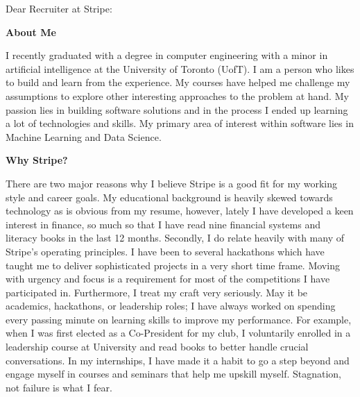\documentclass[a4paper,english]{friggeri-letter}
\begin{document}

\address{
   85 Wood St \\
   Toronto, ON, Canada
}





\opening{Dear Recruiter at Stripe:}

\textbf{About Me}

I recently graduated with a degree in computer engineering with a minor in artificial intelligence at the University of Toronto (UofT). I am a person who likes to build and learn from the experience. My courses have helped me challenge my assumptions to explore other interesting approaches to the problem at hand. My passion lies in building software solutions and in the process I ended up learning a lot of technologies and skills. My primary area of interest within software lies in Machine Learning and Data Science.



\textbf{Why Stripe?}

There are two major reasons why I believe Stripe is a good fit for my working style and career goals. My educational background is heavily skewed towards technology as is obvious from my resume, however, lately I have developed a keen interest in finance, so much so that I have read nine financial systems and literacy books in the last 12 months. Secondly, I do relate heavily with many of Stripe's operating principles. 
I have been to several hackathons which have taught me to deliver sophisticated projects in a very short time frame. Moving with urgency and focus is a requirement for most of the competitions I have participated in. 
Furthermore, I treat my craft very seriously. May it be academics, hackathons, or leadership roles; I have always worked on spending every passing minute on learning skills to improve my performance. 
For example, when I was first elected as a Co-President for my club, I voluntarily enrolled in a leadership course at University and read books to better handle crucial conversations. 
In my internships, I have made it a habit to go a step beyond and engage myself in courses and seminars that help me upskill myself. Stagnation, not failure is what I fear.
\end{document}
